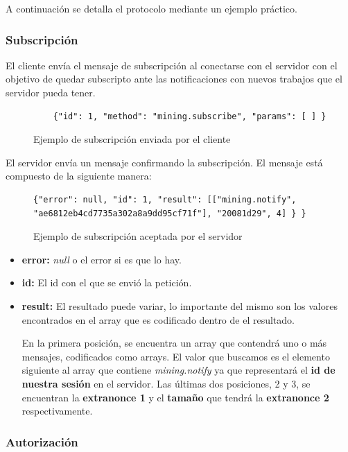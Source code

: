 \documentclass[a4paper, 10pt, twoside]{article}
\begin{document}
A continuación se detalla el protocolo mediante un ejemplo práctico.

\subsubsection{Subscripción}

El cliente envía el mensaje de subscripción al conectarse con el servidor con el objetivo de quedar subscripto ante las notificaciones con nuevos trabajos que el servidor pueda tener.

\begin{figure}[h]
\centering
\begin{lstlisting}
	{"id": 1, "method": "mining.subscribe", "params": [ ] }
\end{lstlisting}
\caption{Ejemplo de subscripción enviada por el cliente}
\end{figure}

El servidor envía un mensaje confirmando la subscripción. El mensaje está compuesto de la siguiente manera:

\begin{figure}[H]
\centering
\begin{lstlisting}
{"error": null, "id": 1, "result": [["mining.notify", "ae6812eb4cd7735a302a8a9dd95cf71f"], "20081d29", 4] } }
\end{lstlisting}
\caption{Ejemplo de subscripción aceptada por el servidor}
\end{figure}

\begin{itemize}
	\item \textbf{error:} \textit{null} o el error si es que lo hay.
	\item \textbf{id:} El id con el que se envió la petición.
	\item \textbf{result:} El resultado puede variar, lo importante del mismo son los valores encontrados en el array que es codificado dentro de el resultado. 

	En la primera posición, se encuentra un array que contendrá uno o más mensajes, codificados como arrays. El valor que buscamos es el elemento siguiente al array que contiene \textit{mining.notify} ya que representará el \textbf{id de nuestra sesión} en el servidor. Las últimas dos posiciones, 2 y 3, se encuentran la \textbf{extranonce 1} y el \textbf{tamaño} que tendrá la \textbf{extranonce 2} respectivamente.
\end{itemize}

\subsubsection{Autorización}
\end{document}
